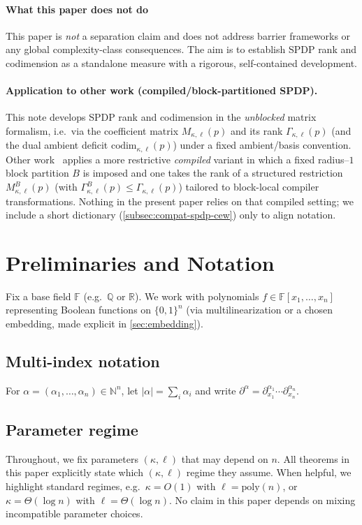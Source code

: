 \documentclass[12pt]{article}
\theoremstyle{definition}
\theoremstyle{remark}
\newcommand{\bits}{\{0,1\}}
\newcommand{\F}{\mathbb{F}}
\newcommand{\N}{\mathbb{N}}
\newcommand{\poly}{\mathrm{poly}}
\begin{document}
\paragraph{What this paper does not do}
This paper is \emph{not} a separation claim and does not address
barrier frameworks or any global complexity-class consequences.
The aim is to establish SPDP rank and codimension as a standalone
measure with a rigorous, self-contained development.

\paragraph{Application to other work (compiled/block-partitioned SPDP).}
This note develops SPDP rank and codimension in the \emph{unblocked} matrix formalism,
i.e.\ via the coefficient matrix $M_{\kappa,\ell}(p)$ and its rank $\Gamma_{\kappa,\ell}(p)$ (and the dual
ambient deficit $\mathrm{codim}_{\kappa,\ell}(p)$) under a fixed ambient/basis convention.
Other work~\citep{Edwards2025} applies a more restrictive \emph{compiled} variant in which a fixed
radius--$1$ block partition $B$ is imposed and one takes the rank of a structured restriction
$M^B_{\kappa,\ell}(p)$ (with $\Gamma^B_{\kappa,\ell}(p)\le \Gamma_{\kappa,\ell}(p)$) tailored to block-local
compiler transformations. Nothing in the present paper relies on that compiled setting;
we include a short dictionary (\ref{subsec:compat-spdp-cew}) only to align notation.

\section{Preliminaries and Notation}
Fix a base field $\F$ (e.g.\ $\mathbb{Q}$ or $\mathbb{R}$). We work with
polynomials $f \in \F[x_1,\dots,x_n]$ representing Boolean functions on
$\bits^n$ (via multilinearization or a chosen embedding, made explicit in
\ref{sec:embedding}).

\subsection{Multi-index notation}
For $\alpha = (\alpha_1,\dots,\alpha_n)\in\N^n$, let $|\alpha|=\sum_i \alpha_i$
and write $\partial^\alpha = \partial_{x_1}^{\alpha_1}\cdots \partial_{x_n}^{\alpha_n}$.

\subsection{Parameter regime}
Throughout, we fix parameters $(\kappa,\ell)$ that may depend on $n$.
All theorems in this paper explicitly state which $(\kappa,\ell)$ regime they assume.
When helpful, we highlight standard regimes, e.g.\ $\kappa=O(1)$ with $\ell=\poly(n)$,
or $\kappa=\Theta(\log n)$ with $\ell=\Theta(\log n)$. No claim in this paper depends
on mixing incompatible parameter choices.
\end{document}
